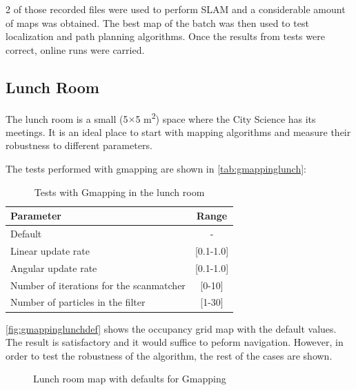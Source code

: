 2 of those recorded files were used to perform SLAM and a considerable amount of maps was obtained. The best map of the batch was then used to test localization and path planning algorithms. Once the results from tests were correct, online runs were carried.

\subsection{Lunch Room}

The lunch room is a small (5$\times$5 m\textsuperscript{2}) space where the City Science has its meetings. It is an ideal place to start with mapping algorithms and measure their robustness to different parameters.

 The tests performed with gmapping are shown in \autoref{tab:gmappinglunch}:
\begin{table}[h]
  \centering
  \begin{tabular}{lc}
  \hline
  \textbf{Parameter} & \textbf{Range} \\ \hline
  Default & - \\ \hline
  Linear update rate & {[}0.1-1.0{]} \\ \hline
  Angular update rate & {[}0.1-1.0{]} \\ \hline
  Number of iterations for the scanmatcher & {[}0-10{]} \\ \hline
  Number of particles in the filter & {[}1-30{]} \\ \hline
  \end{tabular}
  \caption{Tests with Gmapping in the lunch room}
  \label{tab:gmappinglunch}
\end{table}

\autoref{fig:gmappinglunchdef} shows the occupancy grid map with the default values. The result is satisfactory and it would suffice to peform navigation. However, in order to test the robustness of the algorithm, the rest of the cases are shown.
\begin{figure}[h]
  \centering
  \caption{Lunch room map with defaults for Gmapping}
  \label{fig:gmappinglunchdef}
\end{figure}  

